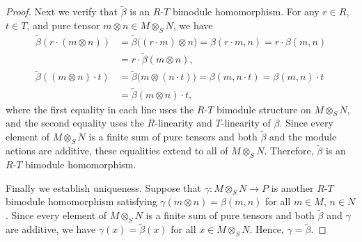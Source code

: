 \begin{proof}
    Next we verify that $\widetilde{\beta}$ is an $R$-$T$ bimodule homomorphism. For any $r \in R$, $t \in T$, and pure tensor $m \otimes n \in M \otimes_S N$, we have
    \begin{align*}
    \widetilde{\beta}(r \cdot (m \otimes n)) &= \widetilde{\beta}\bigl((r \cdot m) \otimes n\bigr) = \beta(r \cdot m, n) = r \cdot \beta(m,n) \\
    &= r \cdot \widetilde{\beta}(m \otimes n), \\
    \widetilde{\beta}((m \otimes n) \cdot t) &= \widetilde{\beta}\bigl(m \otimes (n \cdot t)\bigr) = \beta(m, n \cdot t) = \beta(m,n) \cdot t \\
    &= \widetilde{\beta}(m \otimes n) \cdot t,
    \end{align*}
    where the first equality in each line uses the $R$-$T$ bimodule structure on $M \otimes_S N$, and the second equality uses the $R$-linearity and $T$-linearity of $\beta$. Since every element of $M \otimes_S N$ is a finite sum of pure tensors and both $\widetilde{\beta}$ and the module actions are additive, these equalities extend to all of $M \otimes_S N$. Therefore, $\widetilde{\beta}$ is an $R$-$T$ bimodule homomorphism.

    Finally we establish uniqueness. Suppose that $\gamma : M \otimes_S N \to P$ is another $R$-$T$ bimodule homomorphism satisfying $\gamma(m \otimes n) = \beta(m,n)$ for all $m \in M$, $n \in N$. Since every element of $M \otimes_S N$ is a finite sum of pure tensors and both $\widetilde{\beta}$ and $\gamma$ are additive, we have $\gamma(x) = \widetilde{\beta}(x)$ for all $x \in M \otimes_S N$. Hence, $\gamma = \widetilde{\beta}$.
\end{proof}
